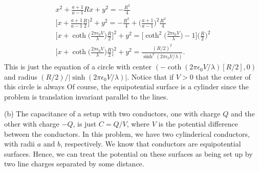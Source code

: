 {\begin{gather}
    x^2 + \frac{a + 1}{a-1}Rx + y^2 = - \frac{R^2}{4} \\
    \Big[ x + \frac{a+1}{a-1} \frac{R}{2} \Big]^2 + y^2 = - \frac{R^2}{4} + \Big(\frac{a+1}{a - 1} \Big)^2  \frac{R^2}{4} \\
    \Big[ x + \coth{\Big( \frac{2 \pi \epsilon_0 V}{\lambda} \Big)} \frac{R}{2} \Big]^2 + y^2 = \Big[ \coth^2{\Big( \frac{2 \pi \epsilon_0 V}{\lambda} \Big)} - 1 \Big] \Big( \frac{R}{2} \Big)^2 \\
    \Big[ x + \coth{\Big( \frac{2 \pi \epsilon_0 V}{\lambda} \Big)} \frac{R}{2} \Big]^2 + y^2 = \frac{(R/2)^2}{\sinh^2{( 2 \pi \epsilon_0 V / \lambda ) }}
.\end{gather}
This is just the equation of a circle with center $(-\coth{(2 \pi \epsilon_0 V / \lambda)} [R / 2], 0)$ and radius $(R/2)/|\sinh{(2 \pi \epsilon_0 V / \lambda)}|$.
Notice that if $V > 0$ that the center of this circle is always 
Of course, the equipotential surface is a cylinder since the problem is translation invariant parallel to the lines.

(b) The capacitance of a setup with two conductors, one with charge $Q$ and the other with charge $-Q$, is just $C = Q/V$, where $V$ is the potential difference between the conductors.
In this problem, we have two cylinderical conductors, with radii $a$ and $b$, respectively.
We know that conductors are equipotential surfaces.
Hence, we can treat the potential on these surfaces as being set up by two line charges separated by some distance.

}






